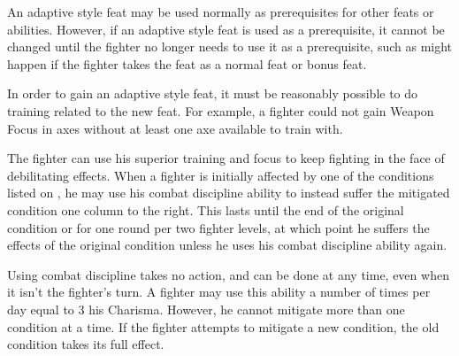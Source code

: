 \par An adaptive style feat may be used normally as prerequisites for other feats or abilities.  However, if an adaptive style feat is used as a prerequisite, it cannot be changed until the fighter no longer needs to use it as a prerequisite, such as might happen if the fighter takes the feat as a normal feat or bonus feat.

\par In order to gain an adaptive style feat, it must be reasonably possible to do training related to the new feat. For example, a fighter could not gain Weapon Focus in axes without at least one axe available to train with.

 The fighter can use his superior training and focus to keep fighting in the face of debilitating effects. When a fighter is initially affected by one of the conditions listed on , he may use his combat discipline ability to instead suffer the mitigated condition one column to the right. This lasts until the end of the original condition or for one round per two fighter levels, at which point he suffers the effects of the original condition unless he uses his combat discipline ability again.
\par Using combat discipline takes no action, and can be done at any time, even when it isn't the fighter's turn. A fighter may use this ability a number of times per day equal to 3 \add his Charisma. However, he cannot mitigate more than one condition at a time. If the fighter attempts to mitigate a new condition, the old condition takes its full effect.


